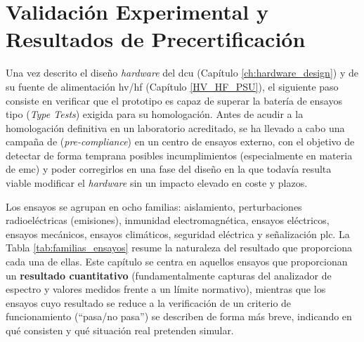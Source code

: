 \chapter{Validación Experimental y Resultados de Precertificación}
\label{ch:precompliance_results}

Una vez descrito el diseño \textit{hardware} del \gls{dcu} (Capítulo \ref{ch:hardware_design}) y de su fuente de alimentación \gls{hv}/\gls{hf} (Capítulo \ref{HV_HF_PSU}), el siguiente paso consiste en verificar que el prototipo es capaz de superar la batería de ensayos tipo (\textit{Type Tests}) exigida para su homologación. Antes de acudir a la homologación definitiva en un laboratorio acreditado, se ha llevado a cabo una campaña de \textbf{} (\textit{pre-compliance}) en un centro de ensayos externo, con el objetivo de detectar de forma temprana posibles incumplimientos (especialmente en materia de \gls{emc}) y poder corregirlos en una fase del diseño en la que todavía resulta viable modificar el \textit{hardware} sin un impacto elevado en coste y plazos.

Los ensayos se agrupan en ocho familias: aislamiento, perturbaciones radioeléctricas (emisiones), inmunidad electromagnética, ensayos eléctricos, ensayos mecánicos, ensayos climáticos, seguridad eléctrica y señalización \gls{plc}. La Tabla \ref{tab:familias_ensayos} resume la naturaleza del resultado que proporciona cada una de ellas. Este capítulo se centra en aquellos ensayos que proporcionan un \textbf{resultado cuantitativo} (fundamentalmente capturas del analizador de espectro y valores medidos frente a un límite normativo), mientras que los ensayos cuyo resultado se reduce a la verificación de un criterio de funcionamiento (``pasa/no pasa'') se describen de forma más breve, indicando en qué consisten y qué situación real pretenden simular.

